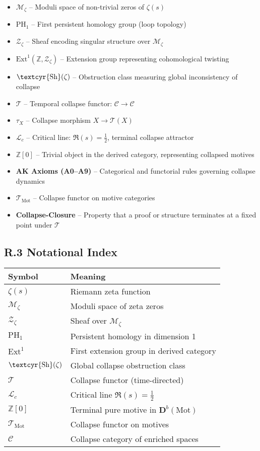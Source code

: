 \documentclass[11pt]{article}
\newcommand{\Sha}{\text{\textcyr{Sh}}}
\begin{document}
\begin{itemize}
    \item \textbf{$\mathcal{M}_\zeta$} – Moduli space of non-trivial zeros of $\zeta(s)$
    \item \textbf{$\mathrm{PH}_1$} – First persistent homology group (loop topology)
    \item \textbf{$\mathcal{Z}_\zeta$} – Sheaf encoding singular structure over $\mathcal{M}_\zeta$
    \item \textbf{$\mathrm{Ext}^1(\mathbb{Z}, \mathcal{Z}_\zeta)$} – Extension group representing cohomological twisting
    \item \textbf{$\Sha(\zeta)$} – Obstruction class measuring global inconsistency of collapse
    \item \textbf{$\mathcal{T}$} – Temporal collapse functor: $\mathcal{C} \to \mathcal{C}$
    \item \textbf{$\tau_X$} – Collapse morphism $X \to \mathcal{T}(X)$
    \item \textbf{$\mathcal{L}_c$} – Critical line: $\Re(s) = \tfrac{1}{2}$, terminal collapse attractor
    \item \textbf{$\mathbb{Z}[0]$} – Trivial object in the derived category, representing collapsed motives
    \item \textbf{AK Axioms (A0–A9)} – Categorical and functorial rules governing collapse dynamics
    \item \textbf{$\mathcal{T}_{\mathrm{Mot}}$} – Collapse functor on motive categories
    \item \textbf{Collapse-Closure} – Property that a proof or structure terminates at a fixed point under $\mathcal{T}$
\end{itemize}

\subsection*{R.3 Notational Index}

\begin{tabular}{ll}
\textbf{Symbol} & \textbf{Meaning} \\
\hline
$\zeta(s)$ & Riemann zeta function \\
$\mathcal{M}_\zeta$ & Moduli space of zeta zeros \\
$\mathcal{Z}_\zeta$ & Sheaf over $\mathcal{M}_\zeta$ \\
$\mathrm{PH}_1$ & Persistent homology in dimension 1 \\
$\mathrm{Ext}^1$ & First extension group in derived category \\
$\Sha(\zeta)$ & Global collapse obstruction class \\
$\mathcal{T}$ & Collapse functor (time-directed) \\
$\mathcal{L}_c$ & Critical line $\Re(s) = \tfrac{1}{2}$ \\
$\mathbb{Z}[0]$ & Terminal pure motive in $\mathbf{D}^b(\text{Mot})$ \\
$\mathcal{T}_{\mathrm{Mot}}$ & Collapse functor on motives \\
$\mathcal{C}$ & Collapse category of enriched spaces \\
\end{tabular}
\end{document}

